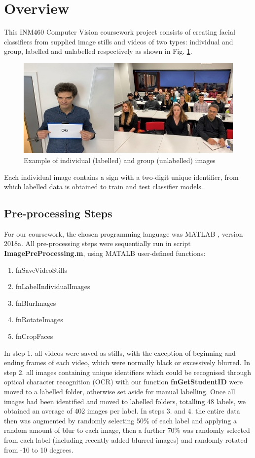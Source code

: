 \section{Overview}

This INM460 Computer Vision coursework project consists of creating facial classifiers from supplied image stills and videos of two types: individual and group, labelled and unlabelled respectively as shown in Fig. \ref {fig:data_example}.
\begin{figure}[h]
 \centering 
 \includegraphics[width=\columnwidth]{images/example-data-50pc.jpg}
 \caption{Example of individual (labelled) and group (unlabelled) images}
 \label{fig:data_example}
\end{figure}

Each individual image contains a sign with a two-digit unique identifier, from which labelled data is obtained to train and test classifier models. 
\subsection{Pre-processing Steps}
For our coursework, the chosen programming language was MATLAB \cite{MATLAB:2018}, version 2018a. All pre-processing steps were sequentially run in script \textbf{ImagePreProcessing.m}, using MATALB user-defined functions:
\begin{enumerate}
\item fnSaveVideoStills
\item fnLabelIndividualImages
\item fnBlurImages
\item fnRotateImages
\item fnCropFaces
\end{enumerate}
In step 1. all videos were saved as stills, with the exception of beginning and ending frames of each video, which were normally black or excessively blurred. In step 2. all images containing unique identifiers which could be recognised through optical character recognition (OCR) with our function \textbf{fnGetStudentID} were moved to a labelled folder, otherwise set aside for manual labelling. Once all images had been identified and moved to labelled folders, totalling 48 labels, we obtained an average of 402 images per label. In steps 3. and 4. the entire data then was augmented by randomly selecting 50\% of each label and applying a random amount of blur to each image, then a further 70\% was randomly selected from each label (including recently added blurred images) and randomly rotated from -10 to 10 degrees.  

